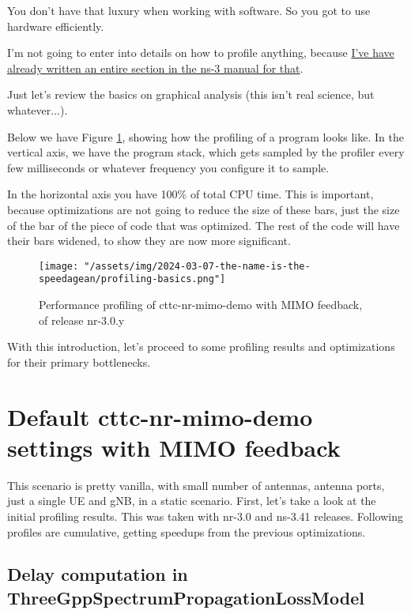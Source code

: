 \documentclass{article}
\begin{document}
You don't have that luxury when working with software.
So you got to use hardware efficiently.

I'm not going to enter into details on how to profile anything, because
\href{https://www.nsnam.org/docs/manual/html/profiling.html}
{I've have already written an entire section in the ns-3 manual for that}.

Just let's review the basics on graphical analysis (this isn't real science, but whatever...).

Below we have Figure \ref{fig:profiling-basics}, showing how the profiling of a program looks
like. In the vertical axis, we have the program stack, which gets sampled by the profiler
every few milliseconds or whatever frequency you configure it to sample.

In the horizontal axis you have 100\% of total CPU time. This is important, because
optimizations are not going to reduce the size of these bars, just the size of the
bar of the piece of code that was optimized. The rest of the code will have their bars
widened, to show they are now more significant.

\begin{figure}
    \texttt{[image: "/assets/img/2024-03-07-the-name-is-the-speedagean/profiling-basics.png"]}
    \caption{Performance profiling of cttc-nr-mimo-demo with MIMO feedback, of release nr-3.0.y}
    \label{fig:profiling-basics}
\end{figure}

With this introduction, let's proceed to some profiling results and optimizations for
their primary bottlenecks.

\section{Default cttc-nr-mimo-demo settings with MIMO feedback}

This scenario is pretty vanilla, with small number of antennas, antenna ports,
just a single UE and gNB, in a static scenario. First, let's take a look at
the initial profiling results. This was taken with nr-3.0 and ns-3.41 releases.
Following profiles are cumulative, getting speedups from the previous optimizations.

\subsection{Delay computation in ThreeGppSpectrumPropagationLossModel}
\end{document}
